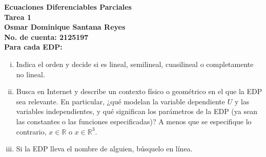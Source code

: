 \documentclass[fleqn]{article}
\newcommand{\real}{\mathbb{R}}
\begin{document}
	\bfseries
	Ecuaciones Diferenciables Parciales \\
	Tarea 1 \\
	Osmar Dominique Santana Reyes \\
	No. de cuenta: 2125197 \\

	Para cada EDP:

	\begin{enumerate}[(i)]
		\item Indica el orden y decide si es lineal, semilineal, cuasilineal o completamente no lineal.
		\item Busca en Internet y describe un contexto físico o geométrico en el que la EDP sea relevante. En particular, ¿qué modelan la variable dependiente $ U $ y las variables independientes, y qué significan los parámetros de la EDP (ya sean las constantes o las funciones especificadas)? A menos que se especifique lo contrario, $ x \in \real $ o $ x \in \real^3 $.
		\item Si la EDP lleva el nombre de alguien, búsquelo en línea.
	\end{enumerate}

	\normalfont
\end{document}
